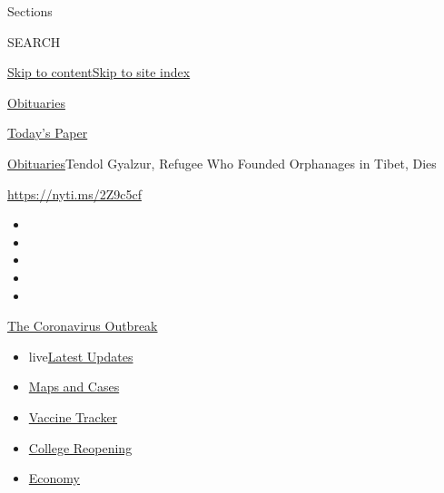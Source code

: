 Sections

SEARCH

\protect\hyperlink{site-content}{Skip to
content}\protect\hyperlink{site-index}{Skip to site index}

\href{https://www.nytimes3xbfgragh.onion/section/obituaries}{Obituaries}

\href{https://myaccount.nytimes3xbfgragh.onion/auth/login?response_type=cookie\&client_id=vi}{}

\href{https://www.nytimes3xbfgragh.onion/section/todayspaper}{Today's
Paper}

\href{/section/obituaries}{Obituaries}\textbar{}Tendol Gyalzur, Refugee
Who Founded Orphanages in Tibet, Dies

\url{https://nyti.ms/2Z9c5cf}

\begin{itemize}
\item
\item
\item
\item
\item
\end{itemize}

\href{https://www.nytimes3xbfgragh.onion/news-event/coronavirus?action=click\&pgtype=Article\&state=default\&region=TOP_BANNER\&context=storylines_menu}{The
Coronavirus Outbreak}

\begin{itemize}
\tightlist
\item
  live\href{https://www.nytimes3xbfgragh.onion/2020/08/04/world/coronavirus-covid-19.html?action=click\&pgtype=Article\&state=default\&region=TOP_BANNER\&context=storylines_menu}{Latest
  Updates}
\item
  \href{https://www.nytimes3xbfgragh.onion/interactive/2020/us/coronavirus-us-cases.html?action=click\&pgtype=Article\&state=default\&region=TOP_BANNER\&context=storylines_menu}{Maps
  and Cases}
\item
  \href{https://www.nytimes3xbfgragh.onion/interactive/2020/science/coronavirus-vaccine-tracker.html?action=click\&pgtype=Article\&state=default\&region=TOP_BANNER\&context=storylines_menu}{Vaccine
  Tracker}
\item
  \href{https://www.nytimes3xbfgragh.onion/2020/08/02/us/covid-college-reopening.html?action=click\&pgtype=Article\&state=default\&region=TOP_BANNER\&context=storylines_menu}{College
  Reopening}
\item
  \href{https://www.nytimes3xbfgragh.onion/live/2020/08/03/business/stock-market-today-coronavirus?action=click\&pgtype=Article\&state=default\&region=TOP_BANNER\&context=storylines_menu}{Economy}
\end{itemize}

